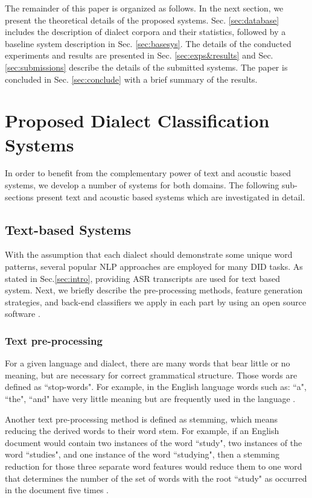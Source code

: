 \documentclass{article}
\begin{document}
The remainder of this paper is organized as follows. In the next section, we present the theoretical details of the proposed systems. Sec. \ref{sec:database} includes the description  of  dialect  corpora  and their  statistics,  followed  by  a  baseline  system  description  in Sec. \ref{sec:basesys}. The details of the conducted experiments and results are presented in Sec. \ref{sec:exps&results} and Sec. \ref{sec:submissions} describe the details of the submitted systems. The paper is concluded in Sec. \ref{sec:conclude} with a brief summary of the results. 

\section{Proposed Dialect Classification Systems}
\label{sec:propsys}

In order to benefit from the complementary power of text and acoustic based systems, we develop a number of systems for both domains. The following sub-sections present text and acoustic based systems which are investigated in detail.

\subsection{Text-based Systems}
\label{ssec:textsys}

With the assumption that each dialect should demonstrate some unique word patterns, several popular NLP approaches are employed for many DID tasks. As stated in Sec.\ref{sec:intro}, providing ASR transcripts are used for text based system. Next, we briefly describe the pre-processing methods, feature generation strategies, and back-end classifiers we apply in each part by using an open source software \cite{yu2013libshorttext}.

\subsubsection{Text pre-processing}
\label{sssec:textpreproc}

For a given language and dialect, there are many words that bear little or no meaning, but are necessary for correct grammatical structure. Those words are defined as ``stop-words". For example, in the English language words such as: ``a", ``the", ``and" have very little meaning but are frequently used in the language \cite{greenberg1997origins}. 

Another text pre-processing method is defined as stemming, which means reducing the derived words to their word stem. For example, if an English document would contain two instances of the word ``study", two instances of the word ``studies", and one instance of the word ``studying", then a stemming reduction for those three separate word features would reduce them to one word that determines the number of the set of words with the root ``study" as occurred in the document five times \cite{hansen2016unsupervised}.
\end{document}
